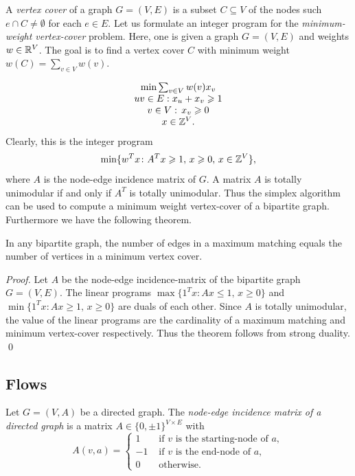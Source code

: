 A \emph{vertex cover} of a graph $G = (V,E)$ is a subset $C\subseteq V$ of the
nodes such $e \cap C \neq \emptyset$ for each $e \in E$. Let us formulate an
integer program for the \emph{minimum-weight vertex-cover}
problem. Here, one is given a graph $G = (V,E)$ and weights $w \in
\mathbb{R}^V$. The goal is to find a vertex cover $C$ with minimum weight
$w(C) = \sum_{v \in V} w(v)$. 

\begin{equation}
\label{eq:47}
  \begin{array}{c}
    \min \sum_{v \in V} w(v) x_v \\
    uv \in E: x_u + x_v \geqslant1 \\
    v \in V:\,  x_v  \geqslant0 \\
    x \in \mathbb{Z}^{V}.
  \end{array}
\end{equation}
Clearly, this is the integer program
\begin{equation}
  \label{eq:48}
  \min\{w^Tx \colon A^Tx \geqslant 1, \, x\geqslant0, \, x \in \mathbb{Z}^V\},
\end{equation}
where $A$ is the node-edge incidence matrix of $G$. 
A matrix $A$ is totally unimodular if and only if $A^T$ is totally
unimodular. Thus the simplex algorithm can be used to compute a
minimum weight vertex-cover of a bipartite graph. Furthermore we have
the following theorem. 

\begin{theorem}
  \label{thr:16}
  In any bipartite graph, the number of edges in a maximum matching
  equals the number of vertices in a minimum vertex cover. 
\end{theorem}

\begin{proof}  
  Let $A$ be the node-edge incidence-matrix of the bipartite graph $G
  = (V,E)$. 
  The linear programs 
  $\max\{1^T x \colon Ax\leq1, \, x\geq0\}$ and $\min\{1^T x \colon Ax\geq1, \,
  x\geq0\}$ are duals of each other. Since $A$ is totally unimodular,
  the value of the linear programs are the cardinality of a maximum
  matching and minimum vertex-cover respectively. Thus the theorem
  follows from strong duality.
  \qed
\end{proof}

\subsection{Flows}

Let $G=(V,A)$ be a directed graph.
The \emph{node-edge incidence matrix of a directed graph}
is a matrix $A \in \{0,\pm1\}^{V\times E}$ with 
\begin{equation}
  \label{po:eq:8}
  A(v,a) = 
  \begin{cases}
    1 & \text{ if } v \text{ is the starting-node of } a, \\
    -1 & \text{ if } v \text{ is the end-node of } a, \\
    0  & \text{ otherwise.}
  \end{cases}
\end{equation}


